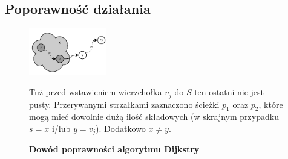\subsection{Poporawność działania}

\begin{figure}[!htbp]
	\includegraphics[width=0.3\textwidth]{Chapter_II/ProofOfDijkstra/a.pdf}
	\caption{\textbf{Dowód poprawności algorytmu Dijkstry}} Tuż przed wstawieniem wierzchołka $v_{j}$ do $S$ ten ostatni nie jest pusty. Przerywanymi strzałkami zaznaczono ścieżki $p_{1}$ oraz $p_{2}$, które mogą mieć dowolnie dużą ilość składowych (w skrajnym przypadku $s = x$ i/lub $y = v_{j}$). Dodatkowo $x \neq y$. \label{fig:proofOfDijkstra}
\end{figure}

